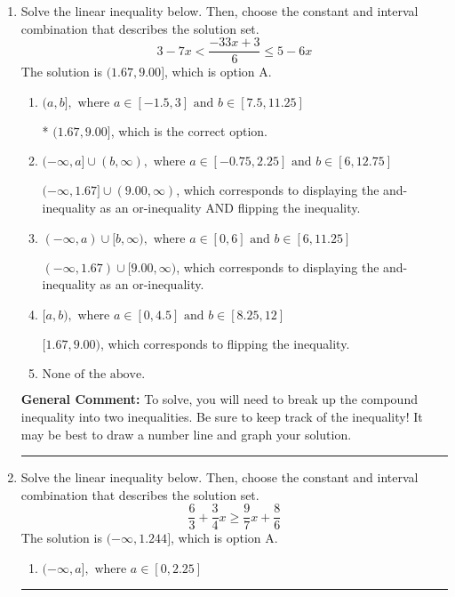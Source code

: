 \documentclass{extbook}[14pt]
\newcommand{\litem}[1]{\item #1

\rule{\textwidth}{0.4pt}}
\begin{document}
\begin{enumerate}
{\begin{enumerate}[label=\Alph*.]
This describes the values less than 8 from 3
\item \( (-\infty, -5] \cup [11, \infty) \)

This describes the values no less than 8 from 3
\item \( [-5, 11] \)

This describes the values no more than 8 from 3
\item \( (-\infty, -5) \cup (11, \infty) \)

This describes the values more than 8 from 3
\item \( \text{None of the above} \)

You likely thought the values in the interval were not correct.
\end{enumerate}

\textbf{General Comment:} When thinking about this language, it helps to draw a number line and try points.
}
\litem{
Solve the linear inequality below. Then, choose the constant and interval combination that describes the solution set.
\[ 3 - 7 x < \frac{-33 x + 3}{6} \leq 5 - 6 x \]The solution is \( (1.67, 9.00] \), which is option A.\begin{enumerate}[label=\Alph*.]
\item \( (a, b], \text{ where } a \in [-1.5, 3] \text{ and } b \in [7.5, 11.25] \)

* $(1.67, 9.00]$, which is the correct option.
\item \( (-\infty, a] \cup (b, \infty), \text{ where } a \in [-0.75, 2.25] \text{ and } b \in [6, 12.75] \)

$(-\infty, 1.67] \cup (9.00, \infty)$, which corresponds to displaying the and-inequality as an or-inequality AND flipping the inequality.
\item \( (-\infty, a) \cup [b, \infty), \text{ where } a \in [0, 6] \text{ and } b \in [6, 11.25] \)

$(-\infty, 1.67) \cup [9.00, \infty)$, which corresponds to displaying the and-inequality as an or-inequality.
\item \( [a, b), \text{ where } a \in [0, 4.5] \text{ and } b \in [8.25, 12] \)

$[1.67, 9.00)$, which corresponds to flipping the inequality.
\item \( \text{None of the above.} \)


\end{enumerate}

\textbf{General Comment:} To solve, you will need to break up the compound inequality into two inequalities. Be sure to keep track of the inequality! It may be best to draw a number line and graph your solution.
}
\litem{
Solve the linear inequality below. Then, choose the constant and interval combination that describes the solution set.
\[ \frac{6}{3} + \frac{3}{4} x \geq \frac{9}{7} x + \frac{8}{6} \]The solution is \( (-\infty, 1.244] \), which is option A.\begin{enumerate}[label=\Alph*.]
\item \( (-\infty, a], \text{ where } a \in [0, 2.25] \)


\end{enumerate}}
\end{enumerate}
\end{document}
